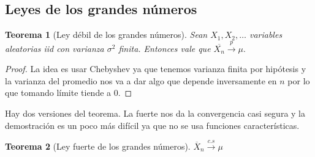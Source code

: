 \documentclass[11pt]{article}
\theoremstyle{plain} %
\newtheorem{teorema}{\color{rojo}Teorema}
\theoremstyle{definition}
\theoremstyle{remark}
\begin{document}
\subsection{Leyes de los grandes números}

\begin{teorema}
	[Ley débil de los grandes números] 
	Sean $X_1, X_2, \dots$ variables aleatorias iid con varianza $\sigma^2$ finita. Entonces vale que
	$\overline{X_n} \overset{p}{\to} \mu.$
\end{teorema}

\begin{proof}
	La idea es usar Chebyshev ya que tenemos varianza finita por hipótesis y la varianza del promedio nos va a dar algo que depende inversamente en $n$ por lo que tomando límite tiende a $0$. 
\end{proof}


Hay dos versiones del teorema. La fuerte nos da la convergencia casi segura y la demostración es un poco más difícil ya que no se usa funciones características. 

\begin{teorema}
	[Ley fuerte de los grandes números]
	$\overline{X}_{n} \overset{c.s}{\to} \mu$	
\end{teorema}
\end{document}
